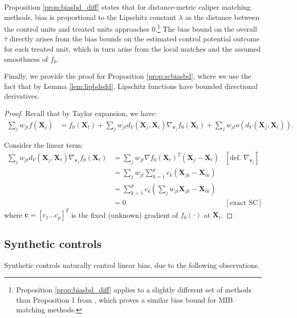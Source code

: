 \documentclass{article}
\newcommand{\Xt}{\mathbf{X}_t}
\newcommand{\Xj}{\mathbf{X}_j}
\newcommand{\vj}{\mathbf{v}_j}
\begin{document}
Proposition \ref{prop:biasbd_diff} states that for distance-metric caliper matching methods, bias is proportional to the Lipschitz constant $\lambda$ as the distance between the control units and treated units approaches 0.\footnote{Proposition \ref{prop:biasbd_diff} applies to a slightly different set of methods than Proposition 1 from \citet{iacus2011multivariate}, which proves a similar bias bound for MIB matching methods.}
The bias bound on the overall $\hat{\tau}$ directly arises from the bias bounds on the estimated control potential outcome for each treated unit, 
which in turn arise from the local matches and the assumed smoothness of $f_0$.

Finally, we provide the proof for Proposition \ref{prop:scbiasbd},
where we use the fact that by Lemma \ref{lem:lipbdsdd}, Lipschitz functions have bounded directional derivatives.
\begin{proof}
    Recall that by Taylor expansion, we have:
    \begin{align*}
        \sum_j w_{jt} f(\Xj)
        &= f_0(\Xt) + \sum_j w_{jt} d_V(\Xj, \Xt) \nabla_{\vj} f_0(\Xt) + \sum_j w_{jt} o(d_V(\Xj, \Xt)).
    \end{align*}
    
    Consider the linear term:
    \begin{align*}
        \sum_j w_{jt}  d_V(\Xj, \Xt) \nabla_{\vj} f_0(\Xt)
        &= \sum_j w_{jt} \nabla f_0(\Xt)^T (\Xj - \Xt) &[\text{def. } \nabla_{\vj}]\\
        &= \sum_j w_{jt} \sum_{k=1}^p c_k (\mathbf{X}_{jk} - \mathbf{X}_{tk}) \\
        &= \sum_{k=1}^p c_k (\sum_j w_{jt} \mathbf{X}_{jk} - \mathbf{X}_{tk}) \\
        &= 0 &[\text{exact SC}]
    \end{align*}
    where $\mathbf{c} = [c_1 \dots c_p]^T$ is the fixed (unknown) gradient of $f_0(\cdot)$ at $\Xt$.
\end{proof}


\subsection{Synthetic controls}
\label{app:scm}

Synthetic controls naturally control linear bias, due to the following observations.
\end{document}
